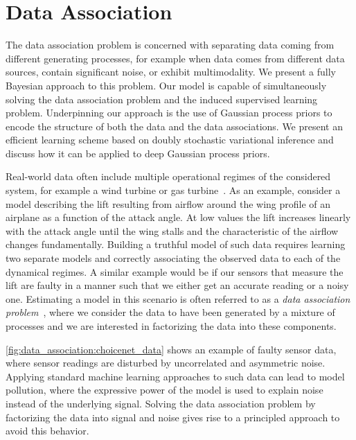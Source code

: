 \chapter{Data Association}
\label{toc:data_association}
The data association problem is concerned with separating data coming from different generating processes, for example when data comes from different data sources, contain significant noise, or exhibit multimodality.
We present a fully Bayesian approach to this problem.
Our model is capable of simultaneously solving the data association problem and the induced supervised learning problem.
Underpinning our approach is the use of Gaussian process priors to encode the structure of both the data and the data associations.
We present an efficient learning scheme based on doubly stochastic variational inference and discuss how it can be applied to deep Gaussian process priors.

Real-world data often include multiple operational regimes of the considered system, for example a wind turbine or gas turbine~\parencite{hein_benchmark_2017}.
As an example, consider a model describing the lift resulting from airflow around the wing profile of an airplane as a function of the attack angle.
At low values the lift increases linearly with the attack angle until the wing stalls and the characteristic of the airflow changes fundamentally.
Building a truthful model of such data requires learning two separate models and correctly associating the observed data to each of the dynamical regimes.
A similar example would be if our sensors that measure the lift are faulty in a manner such that we either get an accurate reading or a noisy one.
Estimating a model in this scenario is often referred to as a \emph{data association problem}~\parencite{barshalom_tracking_1990,cox_review_1993}, where we consider the data to have been generated by a mixture of processes and we are interested in factorizing the data into these components.

\cref{fig:data_association:choicenet_data} shows an example of faulty sensor data, where sensor readings are disturbed by uncorrelated and asymmetric noise.
Applying standard machine learning approaches to such data can lead to model pollution, where the expressive power of the model is used to explain noise instead of the underlying signal.
Solving the data association problem by factorizing the data into signal and noise gives rise to a principled approach to avoid this behavior.

